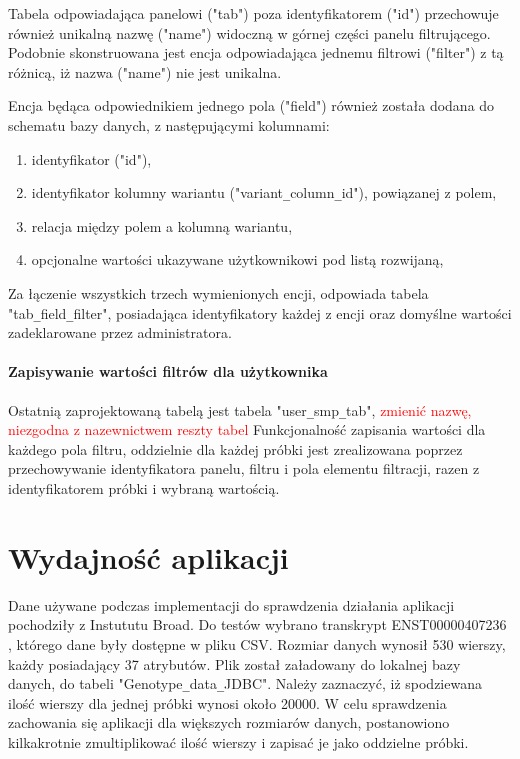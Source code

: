 \documentclass[a4paper,12pt,twoside]{article}
\begin{document}
Tabela odpowiadająca panelowi ("tab") poza identyfikatorem ("id") przechowuje również unikalną nazwę ("name") widoczną w górnej części panelu filtrującego. 
Podobnie skonstruowana jest encja odpowiadająca jednemu filtrowi ("filter") z tą różnicą, 
iż nazwa ("name") nie jest unikalna. 

Encja będąca odpowiednikiem jednego pola ("field") również została dodana do schematu bazy danych,
z następującymi kolumnami: 
\begin{enumerate}[1)]
\item identyfikator ("id"),
\item identyfikator kolumny wariantu ("variant\verb!_!column\verb!_!id"), powiązanej z polem,
\item relacja między polem a kolumną wariantu,
\item opcjonalne wartości ukazywane użytkownikowi pod listą rozwijaną,
\end{enumerate}

Za łączenie wszystkich trzech wymienionych encji, odpowiada tabela 
"tab\verb!_!field\verb!_!filter", posiadająca identyfikatory każdej z encji oraz
domyślne wartości zadeklarowane przez administratora.

\paragraph{Zapisywanie wartości filtrów dla użytkownika} 
Ostatnią zaprojektowaną tabelą jest tabela "user\verb!_!smp\verb!_!tab",
\textcolor{red}{
 zmienić nazwę, niezgodna z nazewnictwem reszty tabel
}
Funkcjonalność zapisania wartości dla każdego pola filtru, oddzielnie dla każdej próbki
jest zrealizowana poprzez przechowywanie identyfikatora panelu, filtru i pola elementu filtracji,
razen z identyfikatorem próbki i wybraną wartością. 

\newpage
\section{Wydajność aplikacji}  

Dane używane podczas implementacji do sprawdzenia działania aplikacji pochodziły
z Instututu Broad.
Do testów wybrano transkrypt ENST00000407236 \cite{testData},
którego dane były dostępne w pliku CSV. Rozmiar danych wynosił 530 wierszy, każdy posiadający 37 atrybutów. Plik został załadowany do lokalnej bazy danych, do tabeli 
"Genotype\verb!_!data\verb!_!JDBC". Należy zaznaczyć, iż spodziewana ilość wierszy dla jednej próbki wynosi około 20000.
 W celu sprawdzenia zachowania się aplikacji 
dla większych rozmiarów danych, postanowiono kilkakrotnie zmultiplikować
ilość wierszy i zapisać je jako oddzielne próbki.
\end{document}
